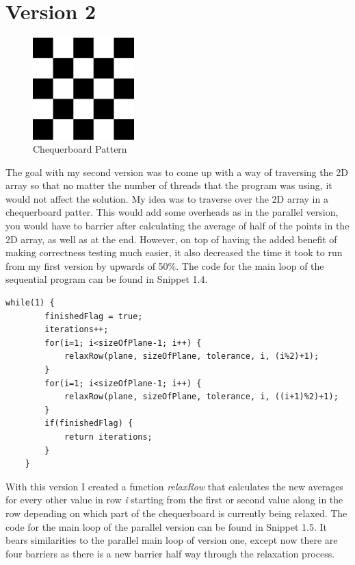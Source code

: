 \documentclass{report}
\begin{document}
\section{Version 2}
\begin{figure}
\vspace{-30pt}
\includegraphics[width=0.35\textwidth]{checkerboard}
\caption{Chequerboard Pattern}
\label{fig:subim1}
\end{figure}
The goal with my second version was to come up with a way of traversing the 2D array so that no matter the number of threads that the program was using, it would not affect the solution. My idea was to traverse over the 2D array in a chequerboard patter. This would add some overheads as in the parallel version, you would have to barrier after calculating the average of half of the points in the 2D array, as well as at the end. However, on top of having the added benefit of making correctness testing much easier, it also decreased the time it took to run from my first version by upwards of 50\%. The code for the main loop of the sequential program can be found in Snippet 1.4.
\\
\begin{lstlisting}[style=customc,caption=Version 2 Sequential Main Loop]
    while(1) {
        finishedFlag = true;
        iterations++;
        for(i=1; i<sizeOfPlane-1; i++) {
            relaxRow(plane, sizeOfPlane, tolerance, i, (i%2)+1);
        }
        for(i=1; i<sizeOfPlane-1; i++) {
            relaxRow(plane, sizeOfPlane, tolerance, i, ((i+1)%2)+1);
        }
        if(finishedFlag) {
            return iterations;
        }
    }
\end{lstlisting}
With this version I created a function \textit{relaxRow} that calculates the new averages for every other value in row \textit{i} starting from the first or second value along in the row depending on which part of the chequerboard is currently being relaxed. The code for the main loop of the parallel version can be found in Snippet 1.5. It bears similarities to the parallel main loop of version one, except now there are four barriers as there is a new barrier half way through the relaxation process.
\end{document}
